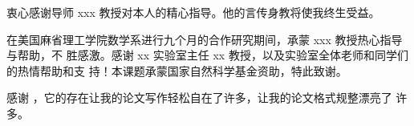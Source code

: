 \begin{acknowledgement}
  衷心感谢导师 xxx 教授对本人的精心指导。他的言传身教将使我终生受益。

  在美国麻省理工学院数学系进行九个月的合作研究期间，承蒙 xxx 教授热心指导与帮助，不
  胜感激。感谢 xx 实验室主任 xx 教授，以及实验室全体老师和同学们的热情帮助和支
  持！本课题承蒙国家自然科学基金资助，特此致谢。

  感谢 \ructhesis，它的存在让我的论文写作轻松自在了许多，让我的论文格式规整漂亮了
  许多。
\end{acknowledgement}
